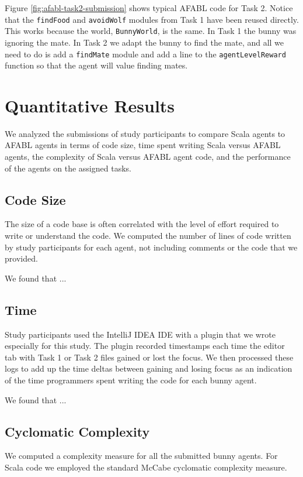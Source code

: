 Figure \ref{fig:afabl-task2-submission} shows typical AFABL code for Task 2. Notice that the {\tt findFood} and {\tt avoidWolf} modules from Task 1 have been reused directly. This works because the world, {\tt BunnyWorld}, is the same. In Task 1 the bunny was ignoring the mate. In Task 2 we adapt the bunny to find the mate, and all we need to do is add a {\tt findMate} module and add a line to the {\tt agentLevelReward} function so that the agent will value finding mates.

\section{Quantitative Results}

We analyzed the submissions of study participants to compare Scala agents to AFABL agents in terms of code size, time spent writing Scala versus AFABL agents, the complexity of Scala versus AFABL agent code, and the performance of the agents on the assigned tasks.

\subsection{Code Size}

The size of a code base is often correlated with the level of effort required to write or understand the code. We computed the number of lines of code written by study participants for each agent, not including comments or the code that we provided.

We found that ...

\subsection{Time}

Study participants used the IntelliJ IDEA IDE with a plugin that we wrote especially for this study. The plugin recorded timestamps each time the editor tab with Task 1 or Task 2 files gained or lost the focus. We then processed these logs to add up the time deltas between gaining and losing focus as an indication of the time programmers spent writing the code for each bunny agent.

We found that ...

\subsection{Cyclomatic Complexity}

We computed a complexity measure for all the submitted bunny agents. For Scala code we employed the standard McCabe cyclomatic complexity measure.


